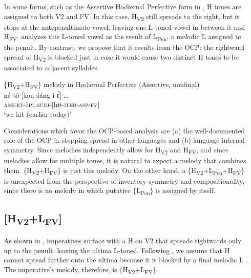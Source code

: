 \documentclass[output=paper,newtxmath,modfonts,nonflat,hidelinks]{langsci/langscibook}
\begin{document}
In some forms, such as the Assertive Hodiernal Perfective form in , H tones are assigned to both V2 and FV. In this case, H\textsubscript{V2} still spreads to the right, but it stops at the antepenultimate vowel, leaving one L-toned vowel in between it and H\textsubscript{FV}. \citet{Roberts-Kohno2014} analyzes this L-toned vowel as the result of L\textsubscript{Pen}, a melodic L  assigned to the penult. By contrast, we propose that it results from the OCP:  the rightward spread of H\textsubscript{V2} is blocked just in case it would cause two distinct H tones to be associated to adjacent syllables.

\ea\label{ex:jones:5}
{\{H\textsubscript{V2}+H\textsubscript{FV}\} melody in Hodiernal Perfective (Assertive, nonfinal)}\\
\gll né-tó-[kon-ááng-i-\'ɛ] …\\
     \textsc{assert-1pl.subj-[}hit-\textsc{iter-asp-fv]}\\
\glt ‘we hit (earlier today)’
\z

Considerations which favor the OCP-based analysis are 
(a) the well-doc\-u\-ment\-ed role of the OCP in stopping  spread in other  languages \citep[e.g.][]{Myers1997,Odden2014} and 
(b) language-internal symmetry. Since  melodies independently allow for H\textsubscript{V2} and H\textsubscript{FV}, and since  melodies allow for multiple tones, it is natural to expect a melody that combines them. \{H\textsubscript{V2}+H\textsubscript{FV}\} is just this melody. On the other hand, a \{H\textsubscript{V2}+L\textsubscript{Pen}+H\textsubscript{FV}\} is unexpected from the perspective of inventory symmetry and compositionality, since there is no melody in which putative \{L\textsubscript{Pen}\} is assigned by itself.


\subsection{[H\textsubscript{V2}+L\textsubscript{FV}]}\label{sec:jones:3.5}


As shown in ,  imperatives surface with a H  on V2 that spreads rightwards only up to the penult, leaving the ultima L-toned. Following \citet{Roberts-Kohno2014}, we assume that H cannot spread further onto the ultima because it is blocked by a final melodic L . The imperative’s melody, therefore, is \{H\textsubscript{V2}+L\textsubscript{FV}\}.
\end{document}
